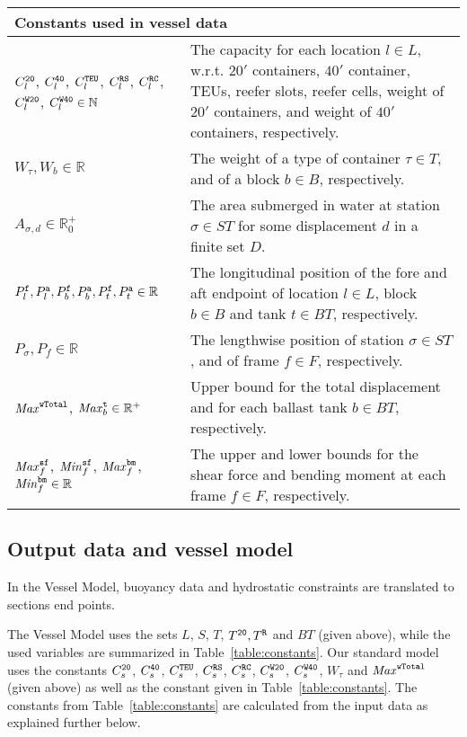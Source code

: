 \vspace{1mm}
\noindent
\begin{tabular}{p{4.5cm}p{8cm}}
\multicolumn{2}{l}{\textbf{Constants used in vessel data}}\\
\hline\noalign{\smallskip}
$C_l^{\texttt{20}}$, $C_l^{\texttt{40}}$, $C_l^{\texttt{TEU}}$, $C_l^{\texttt{RS}}$, $C_l^{\texttt{RC}}$, 
$C_l^{\texttt{W20}}$, $C_l^{\texttt{W40}}\in \mathbb{N}$ & The capacity for each location $l\in L$, w.r.t. $20'$ containers, $40'$ container, TEUs, reefer slots, reefer cells, weight of $20'$ containers, and weight of $40'$ containers, respectively.\\
$W_\tau, W_b\in \mathbb{R}$ & The weight of a type of container $\tau\in T$, and of a block $b\in B$, respectively. \\
$A_{\sigma,d}\in \mathbb{R}^+_0$ & The area submerged in water at station $\sigma\in ST$ for some displacement $d$ in a finite set $D$.\\
$P^{\texttt{f}}_l, P^{\texttt{a}}_l, P^{\texttt{f}}_b, P^{\texttt{a}}_b, P^{\texttt{f}}_t, P^{\texttt{a}}_t\in\mathbb{R}$ & The longitudinal position of the fore and aft endpoint of location $l\in L$, block $b \in B$ and tank $t \in BT$, respectively.\\
$P_\sigma, P_f\in \mathbb{R}$& The lengthwise position of station $\sigma\in ST$, and of frame $f\in F$, respectively.\\
$\mathit{Max}^{\texttt{wTotal}}$, $\mathit{Max}^{\texttt{t}}_b\in \mathbb{R}^+$& Upper bound for the total displacement and for each ballast tank $b\in BT$, respectively.\\
$\mathit{Max}^{\texttt{sf}}_f$, $\mathit{Min}^{\texttt{sf}}_f$, $\mathit{Max}^{\texttt{bm}}_f$, $\mathit{Min}^{\texttt{bm}}_f\in\mathbb{R}$ & The upper and lower bounds for the shear force and bending moment at each frame $f\in F$, respectively.\\
\end{tabular}


\subsection*{Output data and vessel model}
In the Vessel Model, buoyancy data and hydrostatic constraints are translated to sections end points. 

The Vessel Model uses the sets $L$, $S$, $T$, $T^{\texttt{20}}, T^{\texttt{R}}$ and $BT$ (given above), while the used variables are summarized in Table~\ref{table:constants}. Our standard model uses the constants $C_s^{\texttt{20}}$, $C_s^{\texttt{40}}$, $C_s^{\texttt{TEU}}$, $C_s^{\texttt{RS}}$, $C_s^{\texttt{RC}}$, 
$C_s^{\texttt{W20}}$, $C_s^{\texttt{W40}}$, $W_\tau$ and $\mathit{Max}^{\texttt{wTotal}}$ (given above) as well as the constant given in Table~\ref{table:constants}. The constants from Table~\ref{table:constants} are calculated from the input data as explained further below.

